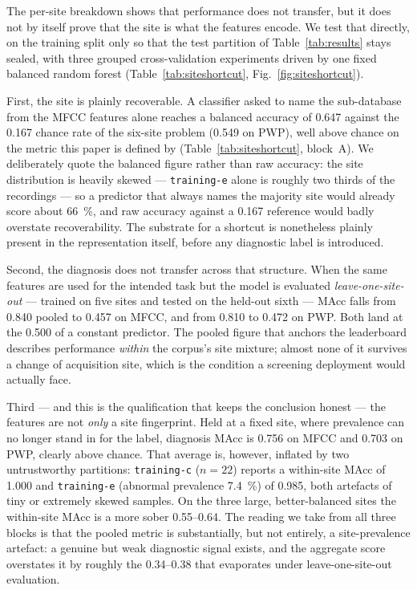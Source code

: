 The per-site breakdown shows that performance does not transfer, but it does not
by itself prove that the site is what the features encode. We test that directly,
on the training split only so that the test partition of
Table~\ref{tab:results} stays sealed, with three grouped cross-validation
experiments driven by one fixed balanced random forest
(Table~\ref{tab:siteshortcut}, Fig.~\ref{fig:siteshortcut}).

First, the site is plainly recoverable. A classifier asked to name the
sub-database from the MFCC features alone reaches a balanced accuracy of
\num{0.647} against the \num{0.167} chance rate of the six-site problem
(\num{0.549} on PWP), well above chance on the metric this paper is defined by
(Table~\ref{tab:siteshortcut}, block~A). We deliberately quote the balanced
figure rather than raw accuracy: the site distribution is heavily skewed ---
\texttt{training-e} alone is roughly two thirds of the recordings --- so a
predictor that always names the majority site would already score about
\SI{66}{\percent}, and raw accuracy against a \num{0.167} reference would badly
overstate recoverability. The substrate for a shortcut is nonetheless plainly
present in the representation itself, before any diagnostic label is introduced.

Second, the diagnosis does not transfer across that structure. When the same
features are used for the intended task but the model is evaluated
\emph{leave-one-site-out} --- trained on five sites and tested on the held-out
sixth --- MAcc falls from \num{0.840} pooled to \num{0.457} on MFCC, and from
\num{0.810} to \num{0.472} on PWP. Both land at the \num{0.500} of a constant
predictor. The pooled figure that anchors the leaderboard describes performance
\emph{within} the corpus's site mixture; almost none of it survives a change of
acquisition site, which is the condition a screening deployment would actually
face.

Third --- and this is the qualification that keeps the conclusion honest --- the
features are not \emph{only} a site fingerprint. Held at a fixed site, where
prevalence can no longer stand in for the label, diagnosis MAcc is \num{0.756}
on MFCC and \num{0.703} on PWP, clearly above chance. That average is, however,
inflated by two untrustworthy partitions: \texttt{training-c} ($n=22$) reports a
within-site MAcc of \num{1.000} and \texttt{training-e} (abnormal prevalence
\SI{7.4}{\percent}) of \num{0.985}, both artefacts of tiny or extremely skewed
samples. On the three large, better-balanced sites the within-site MAcc is a
more sober \num{0.55}--\num{0.64}. The reading we take from all three blocks is
that the pooled metric is substantially, but not entirely, a site-prevalence
artefact: a genuine but weak diagnostic signal exists, and the aggregate score
overstates it by roughly the \num{0.34}--\num{0.38} that evaporates under
leave-one-site-out evaluation.

